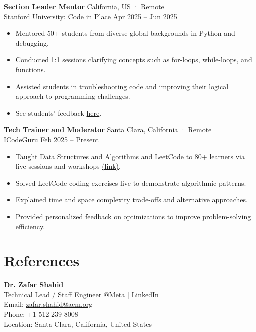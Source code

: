 \documentclass[a4paper,12pt]{article}
\begin{document}
\textbf{Section Leader Mentor} \hfill California, US · Remote \\
\href{https://codeinplace.stanford.edu/}{Stanford University: Code in Place} \hfill Apr 2025 -- Jun 2025
\begin{itemize}[leftmargin=*]
    \item Mentored 50+ students from diverse global backgrounds in Python and debugging.
    \item Conducted 1:1 sessions clarifying concepts such as for-loops, while-loops, and functions.
    \item Assisted students in troubleshooting code and improving their logical approach to programming challenges.
    \item See students’ feedback \href{https://media.licdn.com/dms/image/v2/D4D2DAQH_89FutFda4w/profile-treasury-image-shrink_8192_8192/B4DZfE6yljGUAg-/0/1751355439025?e=1756393200&v=beta&t=n1DErPPd6YfASzT0V4SyNly1bj7Gohi6x4FmvWfIecI}{here}.
\end{itemize}

\vspace{0.5em}

\textbf{Tech Trainer and Moderator} \hfill Santa Clara, California · Remote \\
\href{https://icode.guru/}{ICodeGuru} \hfill Feb 2025 -- Present
\begin{itemize}[leftmargin=*]
    \item Taught Data Structures and Algorithms and LeetCode to 80+ learners via live sessions and workshops \href{https://github.com/Qasim-Gill/Volunteer-Teaching-and-Mentorship}{(link)}.
    \item Solved LeetCode coding exercises live to demonstrate algorithmic patterns.
    \item Explained time and space complexity trade-offs and alternative approaches.
    \item Provided personalized feedback on optimizations to improve problem-solving efficiency.
\end{itemize}


\section{References}

\textbf{Dr. Zafar Shahid} \\
Technical Lead / Staff Engineer @Meta | \href{https://www.linkedin.com/in/zafarshahid/}{LinkedIn} \\
Email: \href{mailto:zafar.shahid@acm.org}{zafar.shahid@acm.org} \\
Phone: +1 512 239 8008 \\
Location: Santa Clara, California, United States
\end{document}

